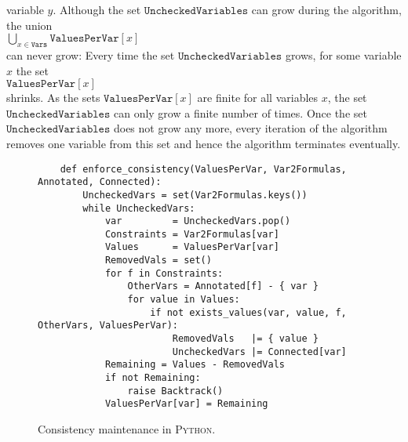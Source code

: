 variable $y$.  Although the set $\texttt{UncheckedVariables}$ can grow during the algorithm,  the union
\\[0.2cm]
\hspace*{1.3cm}
$\bigcup\limits_{x \in \texttt{Vars}} \texttt{ValuesPerVar}[x]$ 
\\[0.2cm]
can never grow:  Every time the set $\texttt{UncheckedVariables}$ grows,
for some variable $x$ the set
\\[0.2cm]
\hspace*{1.3cm}
$\texttt{ValuesPerVar}[x]$ 
\\[0.2cm] 
shrinks.  As the sets $\texttt{ValuesPerVar}[x]$ are finite for all variables $x$, the set
$\texttt{UncheckedVariables}$ can only grow a finite number of times. 
Once the set $\texttt{UncheckedVariables}$ does not grow any more, every iteration of the algorithm removes one
variable from this set and hence the algorithm terminates eventually.

\begin{figure}[!ht]
\centering
\begin{verbatim}
    def enforce_consistency(ValuesPerVar, Var2Formulas, Annotated, Connected):
        UncheckedVars = set(Var2Formulas.keys())
        while UncheckedVars:
            var         = UncheckedVars.pop()
            Constraints = Var2Formulas[var]
            Values      = ValuesPerVar[var]
            RemovedVals = set()
            for f in Constraints:
                OtherVars = Annotated[f] - { var }
                for value in Values:
                    if not exists_values(var, value, f, OtherVars, ValuesPerVar):
                        RemovedVals   |= { value }
                        UncheckedVars |= Connected[var]
            Remaining = Values - RemovedVals
            if not Remaining:
                raise Backtrack()
            ValuesPerVar[var] = Remaining
\end{verbatim}
\vspace*{-0.3cm}
\caption{Consistency maintenance in \textsc{Python}.}
\label{fig:Consistency-Solver.ipynb:enforce_consistency}
\end{figure}

